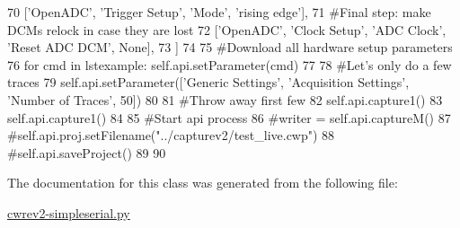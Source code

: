 \begin{DoxyCode}
70                       [\textcolor{stringliteral}{'OpenADC'}, \textcolor{stringliteral}{'Trigger Setup'}, \textcolor{stringliteral}{'Mode'}, \textcolor{stringliteral}{'rising edge'}],
71                       \textcolor{comment}{#Final step: make DCMs relock in case they are lost}
72                       [\textcolor{stringliteral}{'OpenADC'}, \textcolor{stringliteral}{'Clock Setup'}, \textcolor{stringliteral}{'ADC Clock'}, \textcolor{stringliteral}{'Reset ADC DCM'}, \textcolor{keywordtype}{None}],
73                       ]
74         
75         \textcolor{comment}{#Download all hardware setup parameters}
76         \textcolor{keywordflow}{for} cmd \textcolor{keywordflow}{in} lstexample: self.api.setParameter(cmd)
77         
78         \textcolor{comment}{#Let's only do a few traces}
79         self.api.setParameter([\textcolor{stringliteral}{'Generic Settings'}, \textcolor{stringliteral}{'Acquisition Settings'}, \textcolor{stringliteral}{'Number of Traces'}, 50])
80                       
81         \textcolor{comment}{#Throw away first few}
82         self.api.capture1()
83         self.api.capture1()
84 
85         \textcolor{comment}{#Start api process}
86         \textcolor{comment}{#writer = self.api.captureM()}
87         \textcolor{comment}{#self.api.proj.setFilename("../capturev2/test\_live.cwp")}
88         \textcolor{comment}{#self.api.saveProject()}
89 
90 
\end{DoxyCode}


The documentation for this class was generated from the following file\+:\begin{DoxyCompactItemize}
\item 
\hyperlink{cwrev2-simpleserial_8py}{cwrev2-\/simpleserial.\+py}\end{DoxyCompactItemize}
